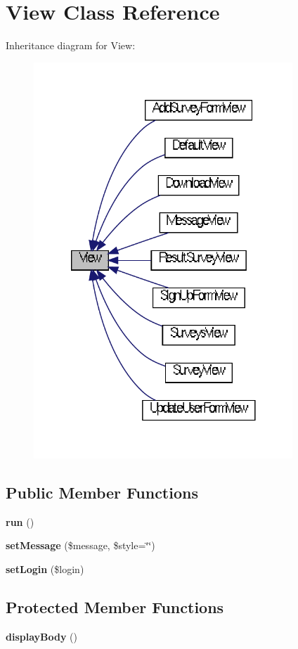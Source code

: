 \section{View Class Reference}
\label{class_view}


Inheritance diagram for View\+:\nopagebreak
\begin{figure}[H]
\begin{center}
\leavevmode
\includegraphics[width=276pt]{class_view__inherit__graph}
\end{center}
\end{figure}
\subsection*{Public Member Functions}
\begin{DoxyCompactItemize}
\item 
{\bf run} ()
\item 
{\bf set\+Message} (\$message, \$style=\char`\"{}\char`\"{})
\item 
{\bf set\+Login} (\$login)
\end{DoxyCompactItemize}
\subsection*{Protected Member Functions}
\begin{DoxyCompactItemize}
\item 
{\bf display\+Body} ()
\end{DoxyCompactItemize}
